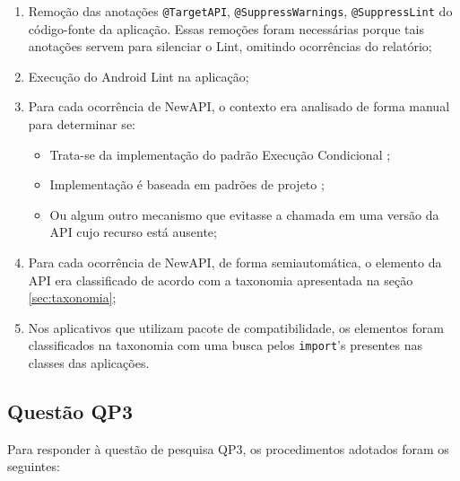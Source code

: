 \begin{enumerate}
	\item Remoção das anotações \texttt{@TargetAPI}, \texttt{@SuppressWarnings},
	 	\texttt{@SuppressLint} do código-fonte da aplicação. Essas remoções foram
	 	 necessárias porque tais anotações servem para silenciar o Lint, omitindo 
	 	 ocorrências do relatório; 
	\item Execução do Android Lint na aplicação;
	\item Para cada ocorrência de NewAPI, o contexto era analisado de forma manual
		para determinar se:
		\begin{itemize}
			\item Trata-se da implementação do padrão Execução Condicional
				\cite{Santos2012};
			\item Implementação é baseada em padrões de projeto \cite{Gamma}; 
			\item Ou algum outro mecanismo que evitasse a chamada em uma versão
			da API cujo recurso está ausente;
		\end{itemize}
	\item Para cada ocorrência de NewAPI, de forma semiautomática, o elemento da API
		era classificado de acordo com a taxonomia apresentada na seção \ref{sec:taxonomia};
	\item Nos aplicativos que utilizam pacote de compatibilidade, os elementos foram
		 classificados na taxonomia com uma busca pelos \texttt{import}'s  presentes
		 nas classes das aplicações.
\end{enumerate}

\subsection{Questão QP3}
Para responder à questão de pesquisa QP3, os procedimentos adotados foram os
seguintes:

